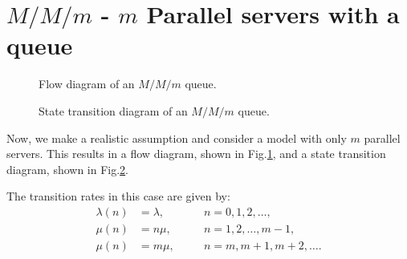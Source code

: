 \documentclass[11pt, a4paper]{report}
\begin{document}
\section{$M/M/m$ - $m$ Parallel servers with a queue}

\begin{figure}[ht]   
        \centering
        
        \caption{Flow diagram of an $M/M/m$ queue.}
    \label{fig:mmm_blk}
\end{figure}
\begin{figure}[ht]   
    \centering
    
    \caption{State transition diagram of an $M/M/m$ queue.}
\label{fig:mmm_std}
\end{figure}

Now, we make a realistic assumption and consider a model with only $m$ parallel servers. This results in a flow diagram, shown in Fig.\ref{fig:mmm_blk}, and a state transition diagram, shown in Fig.\ref{fig:mmm_std}. 

The transition rates in this case are given by:
\begin{align}
    \lambda(n) &= \lambda, && \quad n = 0, 1, 2, \ldots, \\
    \mu(n) &= n \mu, && \quad n = 1, 2, \ldots, m - 1, \\
    \mu(n) &= m \mu, && \quad n = m, m+1, m+2, \ldots.   
\end{align}
\end{document}
